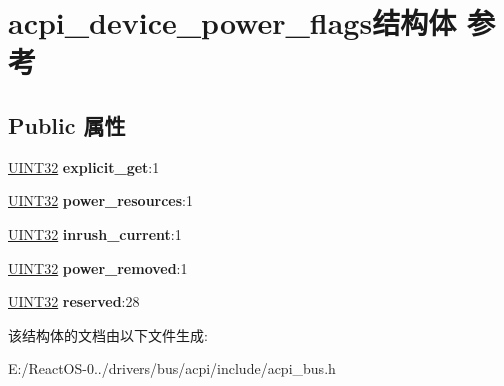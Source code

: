 \hypertarget{structacpi__device__power__flags}{}\section{acpi\+\_\+device\+\_\+power\+\_\+flags结构体 参考}
\label{structacpi__device__power__flags}
\subsection*{Public 属性}
\begin{DoxyCompactItemize}
\item 
\mbox{\label{structacpi__device__power__flags_aff84c21d7795fa6af1ccfb58762b2a9d}} 
\hyperlink{_processor_bind_8h_ae1e6edbbc26d6fbc71a90190d0266018}{U\+I\+N\+T32} {\bfseries explicit\+\_\+get}\+:1
\item 
\mbox{\label{structacpi__device__power__flags_a0a0b587d0a8516c726964a9db5de9302}} 
\hyperlink{_processor_bind_8h_ae1e6edbbc26d6fbc71a90190d0266018}{U\+I\+N\+T32} {\bfseries power\+\_\+resources}\+:1
\item 
\mbox{\label{structacpi__device__power__flags_a7e7857fd55bbdf6f2b0eeb25f2bdcd6f}} 
\hyperlink{_processor_bind_8h_ae1e6edbbc26d6fbc71a90190d0266018}{U\+I\+N\+T32} {\bfseries inrush\+\_\+current}\+:1
\item 
\mbox{\label{structacpi__device__power__flags_ab832502bcd2f20f76d89bb0c93c2a67b}} 
\hyperlink{_processor_bind_8h_ae1e6edbbc26d6fbc71a90190d0266018}{U\+I\+N\+T32} {\bfseries power\+\_\+removed}\+:1
\item 
\mbox{\label{structacpi__device__power__flags_a1f0148222ef68cc7dfea146881c866c2}} 
\hyperlink{_processor_bind_8h_ae1e6edbbc26d6fbc71a90190d0266018}{U\+I\+N\+T32} {\bfseries reserved}\+:28
\end{DoxyCompactItemize}


该结构体的文档由以下文件生成\+:\begin{DoxyCompactItemize}
\item 
E\+:/\+React\+O\+S-\/0../drivers/bus/acpi/include/acpi\+\_\+bus.\+h\end{DoxyCompactItemize}
